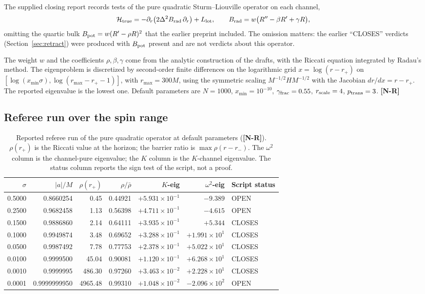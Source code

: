 \documentclass[11pt,a4paper]{article}
\newcommand{\VN}{\textcolor{vn}{\textbf{[N-R]}}}
\theoremstyle{remark}
\theoremstyle{definition}
\begin{document}
The supplied closing report records tests of the pure quadratic Sturm--Liouville operator on each channel,
\[
\mathcal{H}_{\rm true} = -\partial_r\bigl(2\Delta^2 B_{\rm rad}\,\partial_r\bigr) + L_{\rm lot}, \qquad B_{\rm rad} = w\bigl(R'' - \beta R' + \gamma R\bigr),
\]
omitting the quartic bulk $B_{\rm pot} = w(R'-\rho R)^2$ that the earlier preprint included. The omission matters: the earlier ``CLOSES'' verdicts (Section~\ref{sec:retract}) were produced with $B_{\rm pot}$ present and are not verdicts about this operator.

The weight $w$ and the coefficients $\rho,\beta,\gamma$ come from the analytic construction of the drafts, with the Riccati equation integrated by Radau's method. The eigenproblem is discretized by second-order finite differences on the logarithmic grid $x = \log(r - r_+)$ on $[\log(x_{\min}\sigma), \log(r_{\max}-r_+-1)]$, with $r_{\max} = 300M$, using the symmetric scaling $M^{-1/2}HM^{-1/2}$ with the Jacobian $dr/dx = r - r_+$. The reported eigenvalue is the lowest one. Default parameters are $N=1000$, $x_{\min} = 10^{-10}$, $\gamma_{\rm frac} = 0.55$, $r_{\rm scale} = 4$, $p_{\rm trans} = 3$. \VN

\subsection{Referee run over the spin range}

\begin{table}[H]
\centering
\caption{Reported referee run of the pure quadratic operator at default parameters (\VN). $\rho(r_+)$ is the Riccati value at the horizon; the barrier ratio is $\max \rho(r-r_-)$. The $\omega^2$ column is the channel-pure eigenvalue; the $K$ column is the $K$-channel eigenvalue. The status column reports the sign test of the script, not a proof.}
\label{tab:referee}
\footnotesize\begin{tabular}{@{}rrrrrrl@{}}
\toprule
$\sigma$ & $|a|/M$ & $\rho(r_+)$ & $\rho/\bar\rho$ & $K$-eig & $\omega^2$-eig & Script status \\
\midrule
0.5000 & 0.8660254 & 0.45 & 0.44921 & $+5.931\times10^{-1}$ & $-9.389$ & OPEN \\
0.2500 & 0.9682458 & 1.13 & 0.56398 & $+4.711\times10^{-1}$ & $-4.615$ & OPEN \\
0.1500 & 0.9886860 & 2.14 & 0.64111 & $+3.935\times10^{-1}$ & $+5.344$ & CLOSES \\
0.1000 & 0.9949874 & 3.48 & 0.69652 & $+3.288\times10^{-1}$ & $+1.991\times10^{1}$ & CLOSES \\
0.0500 & 0.9987492 & 7.78 & 0.77753 & $+2.378\times10^{-1}$ & $+5.022\times10^{1}$ & CLOSES \\
0.0100 & 0.9999500 & 45.04 & 0.90081 & $+1.120\times10^{-1}$ & $+6.268\times10^{1}$ & CLOSES \\
0.0010 & 0.9999995 & 486.30 & 0.97260 & $+3.463\times10^{-2}$ & $+2.228\times10^{1}$ & CLOSES \\
0.0001 & 0.9999999950 & 4965.48 & 0.99310 & $+1.048\times10^{-2}$ & $-2.096\times10^{2}$ & OPEN \\
\bottomrule
\end{tabular}
\end{table}
\end{document}
